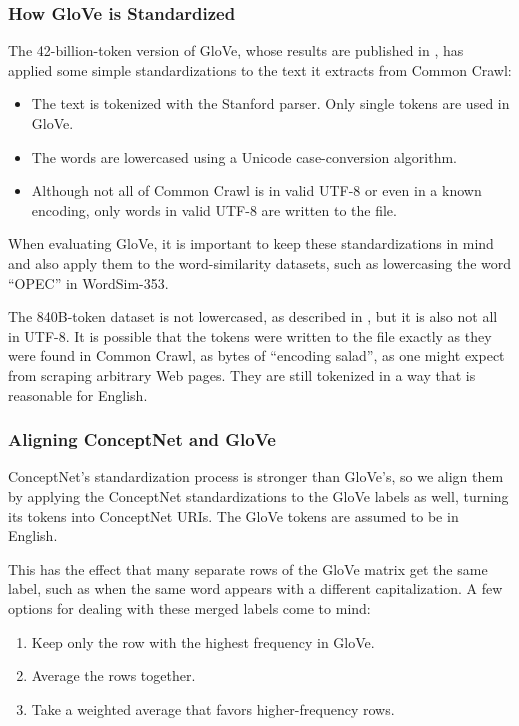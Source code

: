 \documentclass[letterpaper]{article}
\begin{document}
\subsubsection{How GloVe is Standardized}

The 42-billion-token version of GloVe, whose results are published in
\cite{pennington2014glove}, has applied some simple standardizations
to the text it extracts from Common Crawl:

\begin{itemize}
\item The text is tokenized with the Stanford parser. Only single tokens are
    used in GloVe.
\item The words are lowercased using a Unicode case-conversion
    algorithm.
\item Although not all of Common Crawl is in valid UTF-8 or even in a known
    encoding, only words in valid UTF-8 are written to the file.
\end{itemize}

When evaluating GloVe, it is important to keep these standardizations in mind
and also apply them to the word-similarity datasets, such as lowercasing the
word ``OPEC'' in WordSim-353.

The 840B-token dataset is not lowercased, as described in
\cite{pennington2014glove}, but it is also not all in UTF-8. It is possible
that the tokens were written to the file exactly as they were found in
Common Crawl, as bytes of ``encoding salad'', as one might expect from
scraping arbitrary Web pages. They are still tokenized in a way that is
reasonable for English.

\subsubsection{Aligning ConceptNet and GloVe}

ConceptNet's standardization process is stronger than GloVe's, so we align them
by applying the ConceptNet standardizations to the GloVe labels as well, turning
its tokens into ConceptNet URIs. The GloVe tokens are assumed to be in English.

This has the effect that many separate rows of the GloVe matrix get the same
label, such as when the same word appears with a different capitalization. A
few options for dealing with these merged labels come to mind:

\begin{enumerate}
\item Keep only the row with the highest frequency in GloVe.
\item Average the rows together.
\item Take a weighted average that favors higher-frequency rows.
\end{enumerate}
\end{document}
